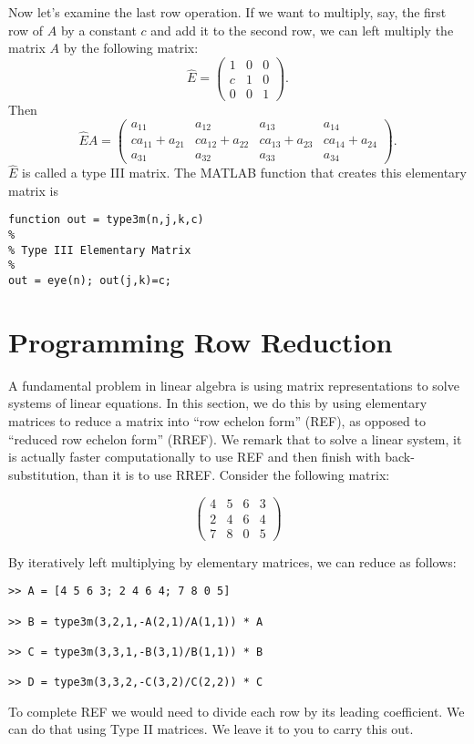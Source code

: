 Now let's examine the last row operation.  If we want to multiply,
say, the first row of $A$ by a constant $c$ and add it to the second
row, we can left multiply the matrix $A$ by the following matrix:
\[
\widehat{E} = \begin{pmatrix}
1&0&0\\
c&1&0\\
0&0&1
\end{pmatrix}.
\]
Then
\[
\widehat{E} A =
\begin{pmatrix}
a_{11}&a_{12}&a_{13}&a_{14}\\
c a_{11} + a_{21}&c a_{12} + a_{22}&c a_{13} + a_{23}&c a_{14} + a_{24}\\
a_{31}&a_{32}&a_{33}&a_{34}
\end{pmatrix}.
\]
$\widehat{E}$ is called a type III matrix.  The MATLAB function that creates this elementary matrix is
\begin{verbatim}
function out = type3m(n,j,k,c)
%
% Type III Elementary Matrix
%
out = eye(n); out(j,k)=c;
\end{verbatim}

\section*{Programming Row Reduction}

A fundamental problem in linear algebra is using matrix representations to solve systems of linear equations.  In this section, we do this by using elementary matrices to reduce a matrix into ``row echelon form'' (REF), as opposed to ``reduced row echelon form'' (RREF).  We remark that to solve a linear system, it is actually faster computationally to use REF and then finish with back-substitution, than it is to use RREF.  Consider the following matrix: 

\[
\begin{pmatrix}
4&5&6&3 \\
2&4&6&4 \\
7&8&0&5
\end{pmatrix}
\]

By iteratively left multiplying by elementary matrices, we can reduce as follows:

\begin{verbatim}
>> A = [4 5 6 3; 2 4 6 4; 7 8 0 5]

>> B = type3m(3,2,1,-A(2,1)/A(1,1)) * A

>> C = type3m(3,3,1,-B(3,1)/B(1,1)) * B

>> D = type3m(3,3,2,-C(3,2)/C(2,2)) * C
\end{verbatim}
To complete REF we would need to divide each row by its leading
coefficient.  We can do that using Type II matrices.  We leave it to
you to carry this out.

